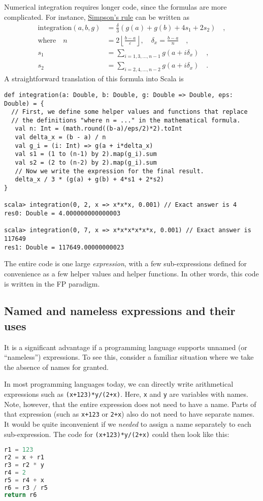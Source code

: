 Numerical integration requires longer code, since the formulas are
more complicated. For instance, \href{https://en.wikipedia.org/wiki/Simpson\%27s_rule}{Simpson's rule}
can be written as
\begin{align*}
\text{integration}\left(a,b,g\right) & =\frac{\delta}{3}\left(g(a)+g(b)+4s_{1}+2s_{2}\right)\quad,\\
\text{where }~~~n & =2\left\lfloor \frac{b-a}{\varepsilon}\right\rfloor ,\quad\delta_{x}=\frac{b-a}{n}\quad,\\
s_{1} & =\sum_{i=1,3,...,n-1}g(a+i\delta_{x})\quad,\\
s_{2} & =\sum_{i=2,4,...,n-2}g(a+i\delta_{x})\quad.
\end{align*}
 A straightforward translation of this formula into Scala is
\begin{lstlisting}
def integration(a: Double, b: Double, g: Double => Double, eps: Double) = {
  // First, we define some helper values and functions that replace
  // the definitions "where n = ..." in the mathematical formula.
   val n: Int = (math.round((b-a)/eps/2)*2).toInt
   val delta_x = (b - a) / n
   val g_i = (i: Int) => g(a + i*delta_x)
   val s1 = (1 to (n-1) by 2).map(g_i).sum
   val s2 = (2 to (n-2) by 2).map(g_i).sum
   // Now we write the expression for the final result.
   delta_x / 3 * (g(a) + g(b) + 4*s1 + 2*s2)
}

scala> integration(0, 2, x => x*x*x, 0.001) // Exact answer is 4
res0: Double = 4.000000000000003

scala> integration(0, 7, x => x*x*x*x*x*x, 0.001) // Exact answer is 117649
res1: Double = 117649.00000000023 
\end{lstlisting}

The entire code is one large \emph{expression}, with a few sub-expressions
defined for convenience as a few helper values and helper functions.
In other words, this code is written in the FP paradigm.

\subsection{Named and nameless expressions and their uses}

It is a significant advantage if a programming language supports unnamed
(or ``nameless'') expressions. To see this, consider a familiar
situation where we take the absence of names for granted.

In most programming languages today, we can directly write arithmetical
expressions such as \texttt{}\lstinline!(x+123)*y/(2+x)!. Here,
\texttt{}\lstinline!x! and \texttt{}\lstinline!y! are variables
with names. Note, however, that the entire expression does not need
to have a name. Parts of that expression (such as \texttt{}\lstinline!x+123!
or \lstinline!2+x!) also do not need to have separate names. It would
be quite inconvenient if we \emph{needed} to assign a name separately
to each sub-expression. The code for \lstinline!(x+123)*y/(2+x)!
could then look like this:
\begin{lstlisting}[language=Python]
r1 = 123
r2 = x + r1
r3 = r2 * y
r4 = 2
r5 = r4 + x
r6 = r3 / r5
return r6
\end{lstlisting}

